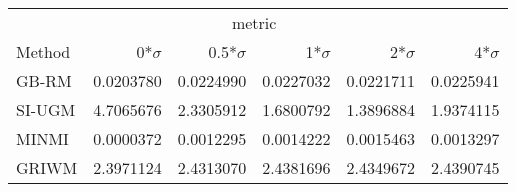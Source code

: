 
\begin{tabular}{lrrrrr}
\toprule
\multicolumn{1}{c}{ } & \multicolumn{4}{c}{metric} \\
\cmidrule(l{3pt}r{3pt}){2-5}
Method & 0*$\sigma$ & 0.5*$\sigma$ & 1*$\sigma$ & 2*$\sigma$ & 4*$\sigma$\\
\midrule
GB-RM & 0.0203780 & 0.0224990 & 0.0227032 & 0.0221711 & 0.0225941\\
SI-UGM & 4.7065676 & 2.3305912 & 1.6800792 & 1.3896884 & 1.9374115\\
MINMI & 0.0000372 & 0.0012295 & 0.0014222 & 0.0015463 & 0.0013297\\
GRIWM & 2.3971124 & 2.4313070 & 2.4381696 & 2.4349672 & 2.4390745\\
\bottomrule
\end{tabular}
